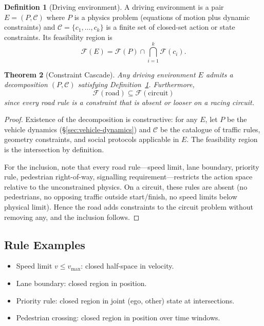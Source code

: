 \documentclass[11pt,twocolumn]{article}
\newtheorem{theorem}{Theorem}
\theoremstyle{definition}
\newtheorem{definition}[theorem]{Definition}
\theoremstyle{remark}
\newcommand{\Feas}{\mathcal{F}}
\newcommand{\cC}{\mathcal{C}}
\begin{document}
\begin{definition}[Driving environment]\label{def:env}
A driving environment is a pair $E = (P, \cC)$ where $P$ is a physics problem (equations of motion plus dynamic constraints) and $\cC = \{c_1, \ldots, c_k\}$ is a finite set of closed-set action or state constraints. Its feasibility region is
\begin{equation}
\Feas(E) = \Feas(P) \cap \bigcap_{i=1}^{k} \Feas(c_i).
\end{equation}
\end{definition}

\begin{theorem}[Constraint Cascade]\label{thm:cascade}
Any driving environment $E$ admits a decomposition $(P, \cC)$ satisfying Definition~\ref{def:env}. Furthermore,
\begin{equation}
\Feas(\mathrm{road}) \subseteq \Feas(\mathrm{circuit})
\end{equation}
since every road rule is a constraint that is absent or looser on a racing circuit.
\end{theorem}

\begin{proof}
Existence of the decomposition is constructive: for any $E$, let $P$ be the vehicle dynamics (\S\ref{sec:vehicle-dynamics}) and $\cC$ be the catalogue of traffic rules, geometry constraints, and social protocols applicable in $E$. The feasibility region is the intersection by definition.

For the inclusion, note that every road rule---speed limit, lane boundary, priority rule, pedestrian right-of-way, signalling requirement---restricts the action space relative to the unconstrained physics. On a circuit, these rules are absent (no pedestrians, no opposing traffic outside start/finish, no speed limits below physical limit). Hence the road adds constraints to the circuit problem without removing any, and the inclusion follows.
\end{proof}

\subsection{Rule Examples}

\begin{itemize}[leftmargin=*,itemsep=2pt]
\item Speed limit $v \le v_{\max}$: closed half-space in velocity.
\item Lane boundary: closed region in position.
\item Priority rule: closed region in joint (ego, other) state at intersections.
\item Pedestrian crossing: closed region in position over time windows.
\end{itemize}
\end{document}
